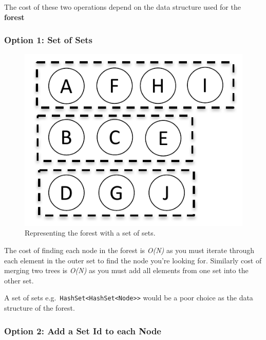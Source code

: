 \documentclass[
]{book}
\begin{document}
The cost of these two operations depend on the data structure used for the \textbf{forest}

\hypertarget{option-1-set-of-sets}{%
\subsubsection{Option 1: Set of Sets}\label{option-1-set-of-sets}}

\begin{figure}

{\centering \includegraphics{img/07-image01} 

}

\caption{Representing the forest with a set of sets.}\label{fig:hashset}
\end{figure}

The {cost of finding} each node in the forest is \emph{O(N)} as you must iterate through each element in the outer set to find the node you're looking for. Similarly {cost of merging} two trees is \emph{O(N)} as you must add all elements from one set into the other set.

A set of sets e.g.~\texttt{HashSet\textless{}HashSet\textless{}Node\textgreater{}\textgreater{}} would be a poor choice as the data structure of the forest.

\hypertarget{option-2-add-a-set-id-to-each-node}{%
\subsubsection{Option 2: Add a Set Id to each Node}\label{option-2-add-a-set-id-to-each-node}}
\end{document}
